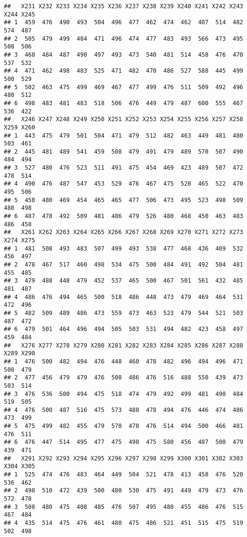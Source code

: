 \documentclass[
]{article}
\begin{document}
\begin{verbatim}
##   X231 X232 X233 X234 X235 X236 X237 X238 X239 X240 X241 X242 X243 X244 X245
## 1  459  476  490  493  504  496  477  462  474  462  407  514  482  574  487
## 2  505  479  499  484  471  496  474  477  483  493  566  473  495  508  506
## 3  468  484  487  490  497  493  473  540  481  514  458  476  470  537  532
## 4  471  462  498  483  525  471  482  470  486  527  588  445  499  500  529
## 5  502  463  475  499  469  467  477  499  476  511  509  492  496  480  512
## 6  498  483  481  483  518  506  476  449  479  487  600  555  467  536  422
##   X246 X247 X248 X249 X250 X251 X252 X253 X254 X255 X256 X257 X258 X259 X260
## 1  443  475  479  501  504  471  479  512  482  463  449  481  480  503  461
## 2  445  481  489  541  459  508  479  491  479  489  570  507  490  484  494
## 3  527  480  476  523  511  491  475  454  469  423  489  507  472  478  514
## 4  490  476  487  547  453  529  476  467  475  520  465  522  470  495  506
## 5  450  480  469  454  465  465  477  506  473  495  523  498  509  488  498
## 6  487  478  492  509  481  486  479  526  480  468  450  463  483  486  458
##   X261 X262 X263 X264 X265 X266 X267 X268 X269 X270 X271 X272 X273 X274 X275
## 1  481  508  493  483  507  499  493  538  477  468  436  409  532  456  497
## 2  478  467  517  460  498  534  475  500  484  491  492  504  481  455  485
## 3  479  488  448  479  452  537  465  500  467  501  561  432  485  481  487
## 4  486  476  494  465  500  518  486  448  473  479  469  464  531  472  496
## 5  482  509  489  486  473  559  473  463  523  479  544  521  503  487  472
## 6  479  501  464  496  494  505  503  531  494  482  423  458  497  459  484
##   X276 X277 X278 X279 X280 X281 X282 X283 X284 X285 X286 X287 X288 X289 X290
## 1  476  500  482  494  476  448  460  478  482  496  494  496  471  508  479
## 2  477  456  479  479  476  508  486  476  516  488  550  439  473  503  514
## 3  476  536  500  494  475  518  474  479  492  499  481  490  484  519  505
## 4  476  500  487  516  475  573  488  478  494  476  446  474  486  473  499
## 5  475  499  482  455  479  570  478  476  514  494  500  466  481  476  511
## 6  476  447  514  495  477  475  498  475  580  456  487  500  479  439  471
##   X291 X292 X293 X294 X295 X296 X297 X298 X299 X300 X301 X302 X303 X304 X305
## 1  525  474  476  483  464  449  504  521  478  413  458  476  520  536  462
## 2  498  510  472  439  500  480  530  475  491  449  479  473  476  572  478
## 3  508  480  475  408  485  476  507  495  480  455  486  476  515  467  484
## 4  435  514  475  476  461  480  475  486  521  451  515  475  519  502  498

\end{verbatim}
\end{document}
